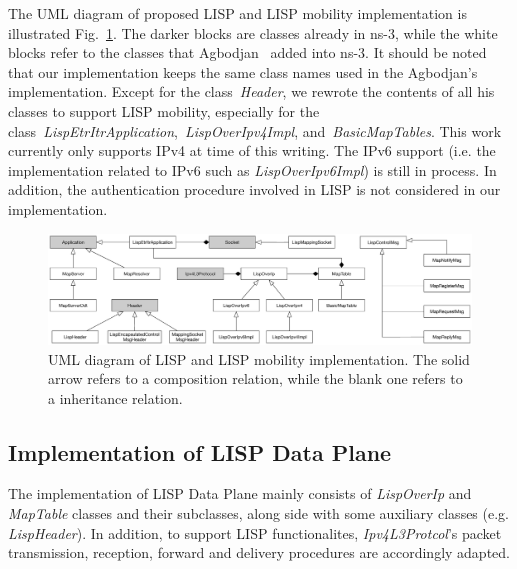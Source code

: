 The UML diagram of proposed LISP and LISP mobility implementation is illustrated Fig.~\ref{LISP_UML}. The darker blocks are classes already in ns-3, while the white blocks refer to the classes that Agbodjan~\cite{lionel2016} added into ns-3. It should be noted that our implementation keeps the same class names used in the Agbodjan's implementation. Except for the class~\emph{Header}, we rewrote the contents of all his classes to support LISP mobility, especially for the  class~\emph{LispEtrItrApplication},~\emph{LispOverIpv4Impl}, and~\emph{BasicMapTables}. %
This work currently only supports IPv4 at time of this writing. The IPv6 support (i.e. the implementation related to IPv6 such as \emph{LispOverIpv6Impl}) is still in process. In addition, the authentication procedure involved in LISP is not considered in our implementation.%
\begin{figure}[!t]
	\centering
	\includegraphics[width=\textwidth]{Pics/LISP_NS3_UML}
	\caption{UML diagram of LISP and LISP mobility implementation. The solid arrow refers to a composition relation, while the blank one refers to a inheritance relation.}
	\label{LISP_UML}
\end{figure}
\subsection{Implementation of LISP Data Plane}
\label{subsec:modifyInternet}
The implementation of LISP Data Plane mainly consists of \emph{LispOverIp} and \emph{MapTable} classes and their subclasses, along side with some auxiliary classes (e.g. \emph{LispHeader}). In addition, to support LISP functionalites, \emph{Ipv4L3Protcol}'s packet transmission, reception, forward and delivery procedures are accordingly adapted.
